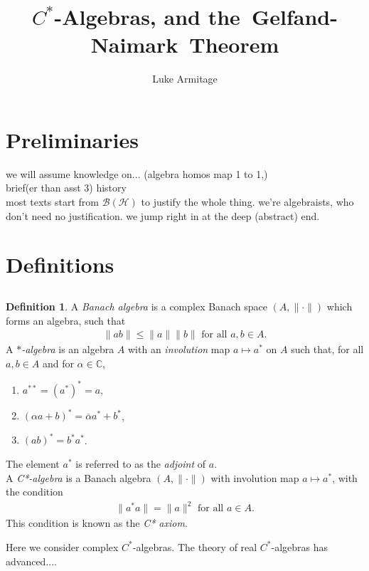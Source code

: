 \documentclass[12pt,a4paper]{amsart}
\author{Luke Armitage}
\title{$C^\ast$-Algebras, and the~Gelfand-Naimark~Theorem}
\theoremstyle{plain}
\theoremstyle{definition}
\newtheorem{defn}{Definition}
\renewcommand{\H}{\mathcal{H}}
\newcommand{\B}{\mathcal{B}}
\newcommand{\BH}{\mathcal{\B(\H)}}
\newcommand{\1}{\mathbbm{1}}
\newcommand{\C}{\mathbb{C}}
\begin{document}
\maketitle
\makeatletter  %
    \providecommand\@dotsep{5}
  \makeatother
\listoftodos\relax

\section{Preliminaries}
we will assume knowledge on... (algebra homos map 1 to 1,)\\
brief(er than asst 3) history \\
most texts start from $\BH$ to justify the whole thing. we're algebraists, who don't need no justification. we jump right in at the deep (abstract) end.


\section{Definitions}

\subsection*{}
\begin{defn}
	A \emph{Banach algebra} is a complex Banach space $(A,\|\cdot\|)$ which forms an 
	algebra, such that 
	\begin{align*}
		\|ab\| \leq \|a\| \|b\| \mbox{ for all } a,b \in A.
	\end{align*}
	A \emph{$\ast$-algebra} is an algebra $A$ with an \emph{involution} map 
	$a \mapsto a^\ast$ on $A$ such that, for all $a,b \in A$ and for $\alpha \in \C$,
	\renewcommand{\labelenumi}{(\roman{enumi})}
	\begin{enumerate}
		\item $a^{\ast\ast} = (a^\ast)^\ast = a$,
		\item $(\alpha a+b)^\ast = \overline{\alpha} a^\ast + b^\ast$,
		\item $(ab)^\ast = b^\ast a^\ast$.
	\end{enumerate}
	The element $a^\ast$ is referred to as the \emph{adjoint} of $a$. 		\\
	A \emph{C*-algebra} is a Banach algebra $(A, \| \cdot \|)$ with involution 
	map $a \mapsto a^\ast$, with the condition
	\begin{align*}
		\|a ^\ast a\| = \|a\|^2 \mbox{ for all } a \in A.
	\end{align*}
	This condition is known as the \emph{C* axiom}. 
\end{defn}
Here we consider complex $C^\ast$-algebras. The theory of real $C^\ast$-algebras has advanced....
\end{document}
